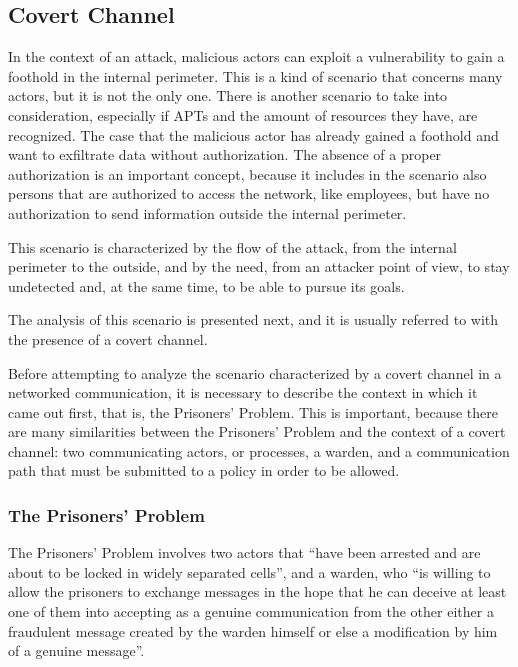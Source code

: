\documentclass[12pt]{article}
\begin{document}
\subsection{Covert Channel}
\label{sub:covert}


In the context of an attack, malicious actors can exploit a vulnerability to gain a foothold in the internal perimeter. This is a kind of scenario that concerns many actors, but it is not the only one. There is another scenario to take into consideration, especially if APTs and the amount of resources they have, are recognized. The case that the malicious actor has already gained a foothold and want to exfiltrate data without authorization. The absence of a proper authorization is an important concept, because it includes in the scenario also persons that are authorized to access the network, like employees, but have no authorization to send information outside the internal perimeter.

This scenario is characterized by the flow of the attack, from the internal perimeter to the outside, and by the need, from an attacker point of view, to stay undetected and, at the same time, to be able to pursue its goals. 

The analysis of this scenario is presented next, and it is usually referred to with the presence of a covert channel.

Before attempting to analyze the scenario characterized by a covert channel in a networked communication, it is necessary to describe the context in which it came out first, that is, the Prisoners' Problem. This is important, because there are many similarities between the Prisoners' Problem and the context of a covert channel: two communicating actors, or processes, a warden, and a communication path that must be submitted to a policy in order to be allowed.

\subsubsection{The Prisoners' Problem}
\label{subsub:prisoners}

The Prisoners' Problem involves two actors that ``have been arrested and are about to be locked in widely separated cells'', and a warden, who ``is willing to allow the prisoners to exchange messages in the hope that he can deceive at least one of them into accepting as a genuine communication from the other either a fraudulent message created by the warden himself or else a modification by him of a genuine message''\cite{prisoners}.
\end{document}
